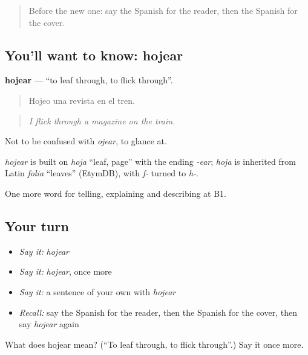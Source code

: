 \label{lesson:ES-C762-hojear}



\begin{quote}
Before the new one: say the Spanish for the reader, then the Spanish for the cover.
\end{quote}

\subsection*{You'll want to know: hojear}
\textbf{hojear} — \textquotedblleft{}to leaf through, to flick through\textquotedblright{}.

\begin{quote}
Hojeo una revista en el tren.
\end{quote}

\begin{quote}
\emph{I flick through a magazine on the train.}
\end{quote}

Not to be confused with \emph{ojear}, to glance at.

\begin{cousinweb}
\emph{hojear} is built on \emph{hoja} \textquotedblleft{}leaf, page\textquotedblright{} with the ending \emph{-ear}; \emph{hoja} is inherited from Latin \emph{folia} \textquotedblleft{}leaves\textquotedblright{} (EtymDB), with \emph{f-} turned to \emph{h-}.
\end{cousinweb}

\begin{grammarlens}[title={What you've built}]
One more word for telling, explaining and describing at B1.
\end{grammarlens}

\subsection*{Your turn}
\begin{itemize}
\raggedright
  \item \emph{Say it:} \emph{hojear}
  \item \emph{Say it:} \emph{hojear}, once more
  \item \emph{Say it:} a sentence of your own with \emph{hojear}
  \item \emph{Recall:} say the Spanish for the reader, then the Spanish for the cover, then say \emph{hojear} again
\end{itemize}

\begin{tcolorbox}[breakable,colback=teal!4,colframe=teal!35!black,title={Before you move on}]
What does hojear mean? (\textquotedblleft{}To leaf through, to flick through\textquotedblright{}.) Say it once more.
\end{tcolorbox}
